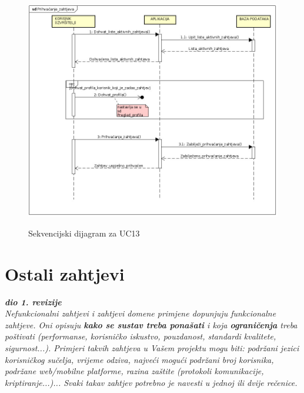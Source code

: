 \newpage
{}
\newline {}\\
\begin{figure}[H]
	\includegraphics[scale=0.48]{slike/sekvencijski_dijagram_prihavcanje_zahtjeva.jpeg} %
	\centering
	\caption \newline Sekvencijski dijagram za UC13
	\label{fig:promjene}
\end{figure}

\newpage
\section{Ostali zahtjevi}

\textbf{\textit{dio 1. revizije}}\\

\textit{Nefunkcionalni zahtjevi i zahtjevi domene primjene dopunjuju funkcionalne zahtjeve. Oni opisuju \textbf{kako se sustav treba ponašati} i koja \textbf{ograničenja} treba poštivati (performanse, korisničko iskustvo, pouzdanost, standardi kvalitete, sigurnost...). Primjeri takvih zahtjeva u Vašem projektu mogu biti: podržani jezici korisničkog sučelja, vrijeme odziva, najveći mogući podržani broj korisnika, podržane web/mobilne platforme, razina zaštite (protokoli komunikacije, kriptiranje...)... Svaki takav zahtjev potrebno je navesti u jednoj ili dvije rečenice.}
